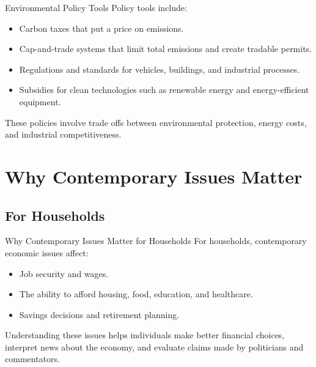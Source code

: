 \documentclass[aspectratio=169]{beamer}
\begin{document}
\begin{frame}{Environmental Policy Tools}
  \transfade
  Policy tools include:
  \begin{itemize}
    \item Carbon taxes that put a price on emissions.
    \item Cap-and-trade systems that limit total emissions and create tradable permits.
    \item Regulations and standards for vehicles, buildings, and industrial processes.
    \item Subsidies for clean technologies such as renewable energy and energy-efficient equipment.
  \end{itemize}

  \vspace{0.3cm}
  These policies involve trade offs between environmental protection, energy costs, and
  industrial competitiveness.
\end{frame}

\section{Why Contemporary Issues Matter}

\subsection{For Households}

\begin{frame}{Why Contemporary Issues Matter for Households}
  \transfade
  For households, contemporary economic issues affect:
  \begin{itemize}
    \item Job security and wages.
    \item The ability to afford housing, food, education, and healthcare.
    \item Savings decisions and retirement planning.
  \end{itemize}

  \vspace{0.3cm}
  Understanding these issues helps individuals make better financial choices, interpret news
  about the economy, and evaluate claims made by politicians and commentators.
\end{frame}

\end{document}

